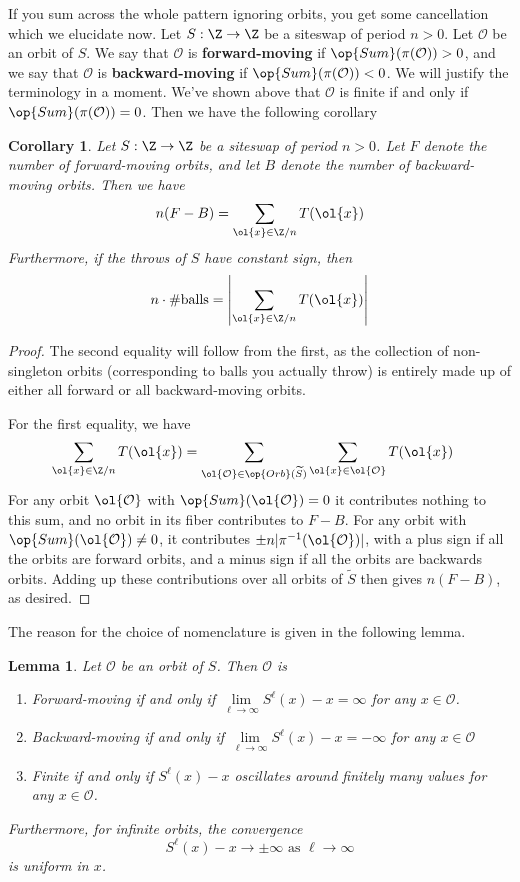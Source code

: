 \documentclass[12nt]{article}
\theoremstyle{plain}
\newtheorem{lemma}{Lemma}
\newtheorem{corollary}[theorem]{Corollary}
\begin{document}
If you sum across the whole pattern ignoring orbits, you get some cancellation which we elucidate now. Let $S : \Z \to \Z$ be a siteswap of period $n > 0$. Let $\mathcal{O}$ be an orbit of $S$. We say that $\mathcal{O}$ is \textbf{forward-moving} if $\op{Sum}(\pi(\mathcal{O})) > 0$, and we say that $\mathcal{O}$ is \textbf{backward-moving} if $\op{Sum}(\pi(\mathcal{O})) < 0$. We will justify the terminology in a moment. We've shown above that $\mathcal{O}$ is finite if and only if $\op{Sum}(\pi(\mathcal{O})) = 0$. Then we have the following corollary
\begin{corollary}
Let $S : \Z \to \Z$ be a siteswap of period $n > 0$. Let $F$ denote the number of forward-moving orbits, and let $B$ denote the number of backward-moving orbits. Then we have
\[
n(F - B) = \sum \limits_{\ol{x} \in \Z/n} T(\ol{x})
\]
Furthermore, if the throws of $S$ have constant sign, then 
\[
n \cdot \# \text{balls} = \left|\sum \limits_{\ol{x} \in \Z/n} T(\ol{x}) \right|
\]
\end{corollary}

\begin{proof}
The second equality will follow from the first, as the collection of non-singleton orbits (corresponding to balls you actually throw) is entirely made up of either all forward or all backward-moving orbits. 

For the first equality, we have
\begin{align*}
\sum \limits_{\ol{x} \in \Z/n} T(\ol{x}) &= \sum \limits_{\ol{\mathcal{O}} \in \op{Orb}(\widetilde{S})} \sum \limits_{\ol{x} \in \ol{\mathcal{O}}} T(\ol{x})
\end{align*}
For any orbit $\ol{\mathcal{O}}$ with $\op{Sum}(\ol{\mathcal{O}}) = 0$ it contributes nothing to this sum, and no orbit in its fiber contributes to $F - B$. For any orbit with $\op{Sum}(\ol{\mathcal{O}}) \neq 0$, it contributes $\pm n|\pi^{-1}(\ol{\mathcal{O}})|$, with a plus sign if all the orbits are forward orbits, and a minus sign if all the orbits are backwards orbits. Adding up these contributions over all orbits of $\widetilde{S}$ then gives $n(F - B)$, as desired.
\end{proof}

The reason for the choice of nomenclature is given in the following lemma.

\begin{lemma}
Let $\mathcal{O}$ be an orbit of $S$. Then $\mathcal{O}$ is
\begin{enumerate}
\item Forward-moving if and only if $\lim \limits_{\ell \to \infty}S^\ell(x) - x= \infty$ for any $x \in \mathcal{O}$.
\item Backward-moving if and only if $\lim \limits_{\ell \to \infty} S^\ell(x) - x = - \infty$ for any $x \in \mathcal{O}$
\item Finite if and only if $S^\ell(x) - x$ oscillates around finitely many values for any $x \in \mathcal{O}$.
\end{enumerate}

Furthermore, for infinite orbits, the convergence
\[
S^{\ell}(x) - x \to \pm \infty \text{ as } \ell \to \infty
\]
is uniform in $x$. \end{lemma}
\end{document}
